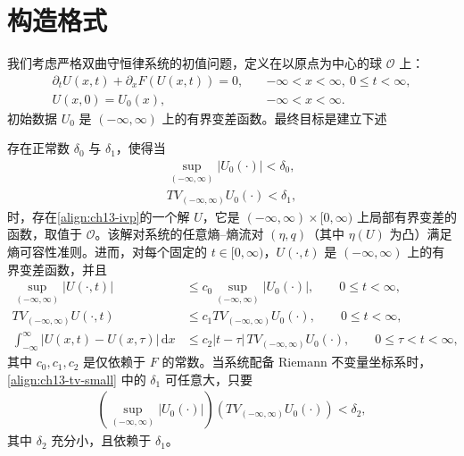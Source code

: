 \documentclass[../../main.tex]{subfiles}
\begin{document}
\section{构造格式}\label{section:ch13-构造格式}

我们考虑严格双曲守恒律系统的初值问题，定义在以原点为中心的球 $\mathcal{O}$ 上：
\begin{align}
\partial_t U(x,t)+\partial_x F(U(x,t))=0,\quad&-\infty<x<\infty,\ 0\leqslant t<\infty,\nonumber\\
U(x,0)=U_0(x),\quad&-\infty<x<\infty.
\label{align:ch13-ivp}
\end{align}
初始数据 $U_0$ 是 $(-\infty,\infty)$ 上的有界变差函数。最终目标是建立下述

\begin{theorem}[小总变差存在性]\label{theorem:ch13-小总变差存在性}
存在正常数 $\delta_0$ 与 $\delta_1$，使得当
\begin{align}
\sup_{(-\infty,\infty)}|U_0(\cdot)|<\delta_0,\label{align:ch13-sup-small}\\
TV_{(-\infty,\infty)}U_0(\cdot)<\delta_1,\label{align:ch13-tv-small}
\end{align}
时，存在\eqref{align:ch13-ivp}的一个解 $U$，它是 $(-\infty,\infty)\times[0,\infty)$ 上局部有界变差的函数，取值于 $\mathcal{O}$。该解对系统的任意熵--熵流对 $(\eta,q)$（其中 $\eta(U)$ 为凸）满足熵可容性准则。进而，对每个固定的 $t\in[0,\infty)$，$U(\cdot,t)$ 是 $(-\infty,\infty)$ 上的有界变差函数，并且
\begin{align}
\sup_{(-\infty,\infty)}|U(\cdot,t)|&\leqslant c_0\sup_{(-\infty,\infty)}|U_0(\cdot)|,\qquad 0\leqslant t<\infty,\label{align:ch13-sup-bound}\\
TV_{(-\infty,\infty)}U(\cdot,t)&\leqslant c_1TV_{(-\infty,\infty)}U_0(\cdot),\qquad 0\leqslant t<\infty,\label{align:ch13-tv-bound}\\
\int_{-\infty}^{\infty}|U(x,t)-U(x,\tau)|\,\mathrm{d}x&\leqslant c_2|t-\tau|\,TV_{(-\infty,\infty)}U_0(\cdot),\qquad 0\leqslant\tau<t<\infty,\label{align:ch13-lip-bound}
\end{align}
其中 $c_0,c_1,c_2$ 是仅依赖于 $F$ 的常数。当系统配备 Riemann 不变量坐标系时，\eqref{align:ch13-tv-small} 中的 $\delta_1$ 可任意大，只要
\begin{align}
\left(\sup_{(-\infty,\infty)}|U_0(\cdot)|\right)\left(TV_{(-\infty,\infty)}U_0(\cdot)\right)<\delta_2,
\label{align:ch13-product-small}
\end{align}
其中 $\delta_2$ 充分小，且依赖于 $\delta_1$。
\end{theorem}
\end{document}
